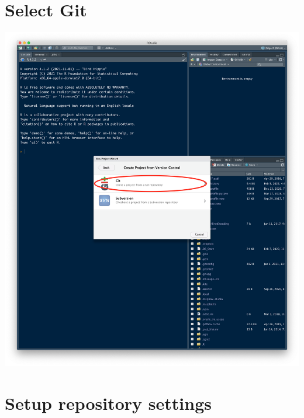 \documentclass[
  12pt,
]{book}
\begin{document}
\hypertarget{select-git}{%
\section{Select Git}\label{select-git}}

\includegraphics{images/clone_step4.png}

\hypertarget{setup-repository-settings}{%
\section{Setup repository settings}\label{setup-repository-settings}}
\end{document}
